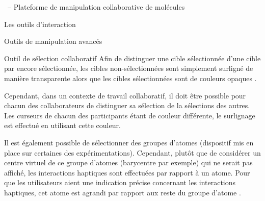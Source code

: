 \documentclass[myfrancais,ngerman,english,french]{mythesis}
\begin{document}
\begin{mychapter}{\myShaddock\ -- Plateforme de manipulation collaborative de molécules}
\begin{mysection}{Les outils d'interaction}
\begin{mysubsection}{Outils de manipulation avancés}
\begin{mysubsubsection}{Outil de sélection collaboratif}
					Afin de distinguer une cible sélectionnée d'une cible par encore sélectionnée, les cibles non-sélectionnées sont simplement surligné de manière transparente alors que les cibles sélectionnées sont de couleurs opaques .

					Cependant, dans un contexte de travail collaboratif, il doit être possible pour chacun des collaborateurs de distinguer sa sélection de la sélections des autres.
					Les curseurs de chacun des participants étant de couleur différente, le surlignage est effectué en utilisant cette couleur.

					Il est également possible de sélectionner des groupes d'atomes (dispositif mis en place sur certaines des expérimentations).
					Cependant, plutôt que de considérer un centre virtuel de ce groupe d'atomes (barycentre par exemple) qui ne serait pas affiché, les interactions haptiques sont effectuées par rapport à un atome.
					Pour que les utilisateurs aient une indication précise concernant les interactions haptiques, cet atome est agrandi par rapport aux reste du groupe d'atome .


\end{mysubsubsection}
\end{mysubsection}
\end{mysection}
\end{mychapter}
\end{document}
